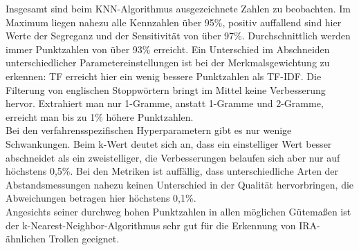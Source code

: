 Insgesamt sind beim KNN-Algorithmus ausgezeichnete Zahlen zu beobachten. Im Maximum liegen  nahezu alle Kennzahlen über 95\%, positiv auffallend sind hier Werte der Segreganz und der Sensitivität von über 97\%. Durchschnittlich werden immer Punktzahlen von über 93\% erreicht. Ein Unterschied im Abschneiden unterschiedlicher Parametereinstellungen ist bei der Merkmalsgewichtung zu erkennen: TF erreicht hier ein wenig bessere Punktzahlen als TF-IDF. Die Filterung von englischen Stoppwörtern bringt im Mittel keine Verbesserung hervor. Extrahiert man nur 1-Gramme, anstatt 1-Gramme und 2-Gramme, erreicht man bis zu 1\% höhere Punktzahlen.\\
Bei den verfahrensspezifischen Hyperparametern gibt es nur wenige Schwankungen. Beim k-Wert deutet sich an, dass ein einstelliger Wert besser abschneidet als ein zweistelliger, die Verbesserungen belaufen sich aber nur auf höchstens 0,5\%. Bei den Metriken ist auffällig, dass unterschiedliche Arten der Abstandsmessungen nahezu keinen Unterschied in der Qualität hervorbringen, die Abweichungen betragen hier höchstens 0,1\%.\\
Angesichts seiner durchweg hohen Punktzahlen in allen möglichen Gütemaßen ist der k-Nearest-Neighbor-Algorithmus sehr gut für die Erkennung von IRA-ähnlichen Trollen geeignet.

